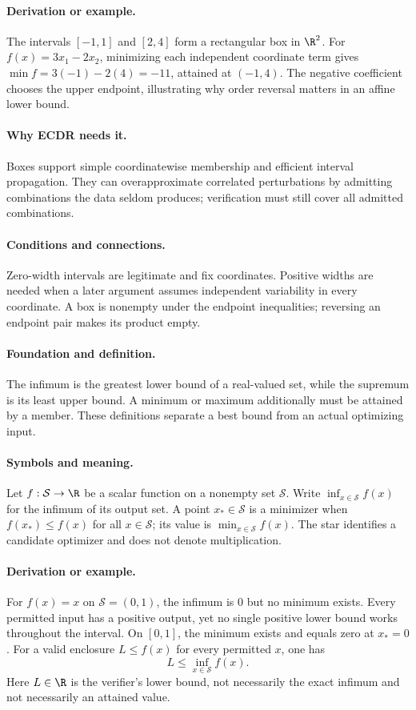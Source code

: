 \paragraph{Derivation or example.}
The intervals $[-1,1]$ and $[2,4]$ form a rectangular box in $\R^2$.
For $f(x)=3x_1-2x_2$, minimizing each independent coordinate term
gives $\min f=3(-1)-2(4)=-11$, attained at $(-1,4)$.
The negative coefficient chooses the upper endpoint, illustrating why
order reversal matters in an affine lower bound.
\paragraph{Why ECDR needs it.}
Boxes support simple coordinatewise membership and efficient interval
propagation. They can overapproximate correlated perturbations by
admitting combinations the data seldom produces; verification must
still cover all admitted combinations.
\paragraph{Conditions and connections.}
Zero-width intervals are legitimate and fix coordinates. Positive widths
are needed when a later argument assumes independent variability in
every coordinate. A box is nonempty under the endpoint inequalities;
reversing an endpoint pair makes its product empty.

\paragraph{Foundation and definition.}
The infimum is the greatest lower bound of a real-valued set, while the
supremum is its least upper bound. A minimum or maximum additionally
must be attained by a member. These definitions separate a best bound
from an actual optimizing input.
\paragraph{Symbols and meaning.}
Let $f:\mathcal S\to\R$ be a scalar function on a nonempty set
$\mathcal S$. Write
$\inf_{x\in\mathcal S}f(x)$ for the infimum of its output set.
A point $x_*\in\mathcal S$ is a minimizer when
$f(x_*)\le f(x)$ for all $x\in\mathcal S$; its value is
$\min_{x\in\mathcal S}f(x)$. The star identifies a candidate
optimizer and does not denote multiplication.
\paragraph{Derivation or example.}
For $f(x)=x$ on $\mathcal S=(0,1)$, the infimum is $0$ but no
minimum exists. Every permitted input has a positive output, yet no
single positive lower bound works throughout the interval. On
$[0,1]$, the minimum exists and equals zero at $x_*=0$.
For a valid enclosure $L\le f(x)$ for every permitted $x$, one has
\[
 L\le\inf_{x\in\mathcal S}f(x).
\]
Here $L\in\R$ is the verifier's lower bound, not necessarily the
exact infimum and not necessarily an attained value.
